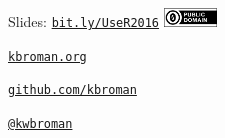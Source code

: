 \documentclass[12pt,t]{beamer}
\begin{document}
\begin{frame}[c]{}

\Large

Slides: \href{http://bit.ly/UseR2016}{\tt bit.ly/UseR2016} \quad
\includegraphics[height=5mm]{Figs/cc-zero.png}

\vspace{10mm}

\href{http://kbroman.org}{\tt kbroman.org}

\vspace{10mm}

\href{https://github.com/kbroman}{\tt github.com/kbroman}

\vspace{10mm}

\href{https://twitter.com/kwbroman}{\tt @kwbroman}


\end{frame}
\end{document}
